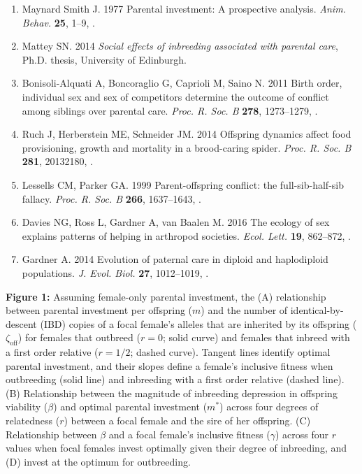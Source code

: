 \documentclass[12pt]{article}
\begin{document}
\begin{enumerate}
\item{Maynard Smith J. 1977 {Parental investment: A prospective analysis}.
  \textit{Anim. Behav.} \textbf{25}, 1--9,
  .}

\item{Mattey SN. 2014 \textit{{Social effects of inbreeding associated with
  parental care}}, Ph.D. thesis, University of Edinburgh.}

\item{Bonisoli-Alquati A, Boncoraglio G, Caprioli M, Saino N. 2011 {Birth
  order, individual sex and sex of competitors determine the outcome of
  conflict among siblings over parental care.} \textit{Proc. R. Soc. B}
  \textbf{278}, 1273--1279, .}

\item{Ruch J, Herberstein ME, Schneider JM. 2014 {Offspring dynamics
  affect food provisioning, growth and mortality in a brood-caring spider}.
  \textit{Proc. R. Soc. B} \textbf{281}, 20132180,
  .}

\item{Lessells CM, Parker GA. 1999 {Parent-offspring conflict: the
  full-sib-half-sib fallacy}. \textit{Proc. R. Soc. B}
  \textbf{266}, 1637--1643, .}

\item{Davies NG, Ross L, Gardner A, van Baalen M. 2016 {The ecology of
  sex explains patterns of helping in arthropod societies}. \textit{Ecol.
  Lett.} \textbf{19}, 862--872, .}

\item{Gardner A. 2014 {Evolution of paternal care in diploid and haplodiploid populations.}
  \textit{J. Evol. Biol.} \textbf{27}, 1012–1019, .}

\end{enumerate}

\clearpage

\noindent \textbf{Figure 1:} Assuming female-only parental investment, the (A) relationship between parental investment per offspring ($m$) and the number of identical-by-descent (IBD) copies of a focal female's alleles that are inherited by its offspring ($\zeta_{\textrm{off}}$) for females that outbreed ($r=0$; solid curve) and females that inbreed with a first order relative ($r=1/2$; dashed curve). Tangent lines identify optimal parental investment, and their slopes define a female's inclusive fitness when outbreeding (solid line) and inbreeding with a first order relative (dashed line). (B) Relationship between the magnitude of inbreeding depression in offspring viability ($\beta$) and optimal parental investment ($m^{*}$) across four degrees of relatedness ($r$) between a focal female and the sire of her offspring. (C) Relationship between $\beta$ and a focal female's inclusive fitness ($\gamma$) across four $r$ values when focal females invest optimally given their degree of inbreeding, and (D) invest at the optimum for outbreeding. \\
\end{document}
